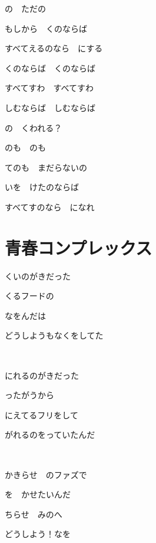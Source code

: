 \documentclass[12pt,a4paper]{article}
\begin{document}
の　ただの

もしから　くのならば

すべてえるのなら　にする

くのならば　くのならば

すべてすわ　すべてすわ

しむならば　しむならば

の　くわれる？

のも　のも

てのも　まだらないの

いを　けたのならば

すべてすのなら　になれ


\section{青春コンプレックス}

くいのがきだった

くるフードの

なをんだは

どうしようもなくをしてた

~

にれるのがきだった

ったがうから

にえてるフリをして

がれるのをっていたんだ

~

かきらせ　のファズで

を　かせたいんだ

ちらせ　みのへ

どうしよう！なを
\end{document}
